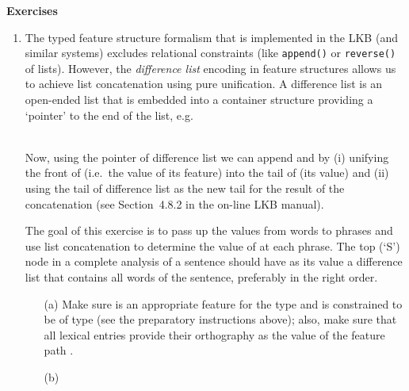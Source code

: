 \documentclass[10pt]{article}
\begin{document}
\smallskip
\textbf{Exercises}
\begin{enumerate}
  \item The typed feature structure formalism that is implemented in
        the LKB (and similar systems) excludes relational constraints
        (like {\tt append()} or {\tt reverse()} of lists).  However,
        the {\em difference list\/} encoding in feature structures
        allows us to achieve list concatenation using pure
        unification.  A difference list is an open-ended list that is
        embedded into a container structure providing a `pointer' to
        the end of the list, e.g.\\
        \centerline{%
        \hspace{1cm}
        }\\
        Now, using the  pointer of difference list  we
        can append  and  by (i) unifying the front of
         (i.e.\ the value of its  feature) into the
        tail of  (its  value) and (ii) using the tail
        of difference list  as the new tail for the result of
        the concatenation (see Section~4.8.2 in the on-line LKB manual).
  \item []
        The goal of this exercise is to pass up the  values
        from words to phrases and use list concatenation to determine
        the value of  at each phrase.  The top (`S') node
        in a complete analysis of a sentence should have as its
         value a difference list that contains all words of
        the sentence, preferably in the right order.
        \begin{itemize}
          \item [(a)]
                Make sure  is an appropriate feature for the
                type  and is constrained to be of type
                 (see the preparatory instructions
                above); also, make sure that all lexical entries
                provide their orthography as the value of the feature
                path .
          \item [(b)]

\end{itemize}
\end{enumerate}
\end{document}
